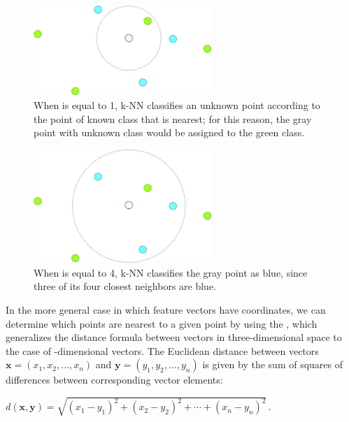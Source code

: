 \begin{figure}[h]
\centering
\mySfFamily
\includegraphics[width = 0.6\textwidth]{../images_CMYK/knn_neighborhood_k=1}
\caption{When  is equal to 1, k-NN classifies an unknown point according to the point of known class that is nearest; for this reason, the gray point with unknown class would be assigned to the green class.}
\label{fig:knn_neighborhood_k=1}
\end{figure}

\begin{figure}[h]
\centering
\mySfFamily
\includegraphics[width = 0.6\textwidth]{../images_CMYK/knn_neighborhood_k=4}
\caption{When  is equal to 4, k-NN classifies the gray point as blue, since three of its four closest neighbors are blue.}
\label{fig:knn_neighborhood_k=4}
\end{figure}

\begin{qbox}\end{qbox}

In the more general case in which feature vectors have  coordinates, we can determine which points are nearest to a given point by using the , which generalizes the distance formula between vectors in three-dimensional space to the case of -dimensional vectors. The Euclidean distance between vectors $\mathbf{x} = (x_1, x_2, \ldots, x_n)$ and $\mathbf{y} = (y_1, y_2, \ldots, y_n)$ is given by the sum of squares of differences between corresponding vector elements:
\begin{center}
$d(\mathbf{x}, \mathbf{y}) = \sqrt{(x_1 - y_1)^2 + (x_2 - y_2)^2 + \cdots + (x_n-y_n)^2}\,.$
\end{center}

